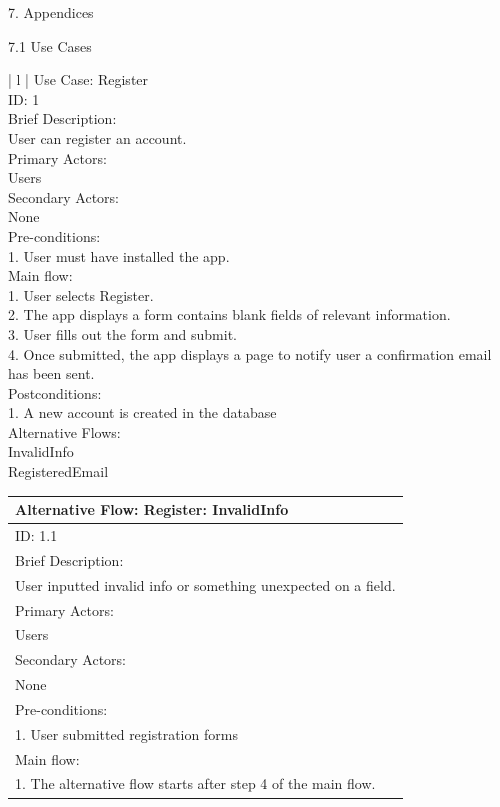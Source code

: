 \documentclass{article}
\begin{document}
\begin{flushleft}
{\huge 7. Appendices}\par
{\Large 7.1 Use Cases}\par
\begin{longtable}{ | l |}
\hline
{} {Use Case: Register}\\
\hline
ID: 1\\
\hline
Brief Description:\\ 
User can register an account.\\
\hline
Primary Actors:\\
Users\\
\hline
Secondary Actors:\\
None\\
\hline
Pre-conditions:\\
1. User must have installed the app.\\
\hline
Main flow:\\
1. User selects Register.\\
2. The app displays a form contains blank fields of relevant information.\\
3. User fills out the form and submit.\\
4. Once submitted, the app displays a page to notify user a confirmation email has been sent.\\
\hline
Postconditions:\\
1. A new account is created in the database\\
\hline
Alternative Flows:\\
InvalidInfo\\
RegisteredEmail\\
\hline
\end{longtable}
\begin{longtable}[l]{| l |}
\hline
Alternative Flow: Register: InvalidInfo\\
\hline
ID: 1.1\\
\hline
Brief Description: \\
User inputted invalid info or something unexpected on a field.\\
\hline
Primary Actors:\\
Users\\
\hline
Secondary Actors:\\
None\\
\hline
Pre-conditions:\\
1. User submitted registration forms\\
\hline
Main flow:\\
1. The alternative flow starts after step 4 of the main flow.\\

\end{longtable}
\end{flushleft}
\end{document}
